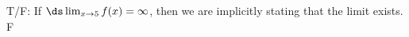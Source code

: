 {T/F: If $\ds \lim_{x\to 5} f(x) = \infty$, then we are implicitly stating that the limit exists.}
{F}
